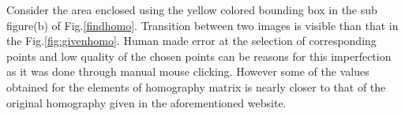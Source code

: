 \documentclass[a4paper,11pt]{article}%
\begin{document}
Consider the area enclosed using the yellow colored bounding box in the sub figure(b) of Fig.\ref{findhomo}. Transition between two images is visible than that in the Fig.\ref{fig:givenhomo}. Human made error at the selection of corresponding points and low quality of the chosen points can be reasons for this imperfection as it was done through manual mouse clicking. However some of the values obtained for the elements of homography matrix is nearly closer to that of the original homography given in the aforementioned website.\\%
\end{document}

